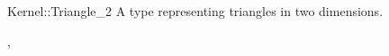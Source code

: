 \begin{ccRefConcept}{Kernel::Triangle_2}
A type representing triangles in two dimensions.

\ccRefines
{},

\ccSeeAlso
{}

\end{ccRefConcept}
